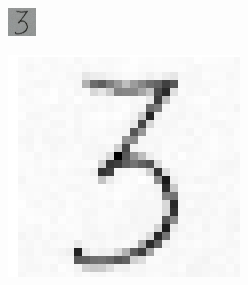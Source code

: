 \begin{frame}[plain]
\begin{figure}
\begin{subfigure}{0.2\textwidth}
\includegraphics[width = \textwidth]{todd_three}
\end{subfigure}
\begin{subfigure}{0.2\textwidth}
\includegraphics[width = \textwidth]{clean_three}

\end{subfigure}
\end{figure}
\end{frame}
